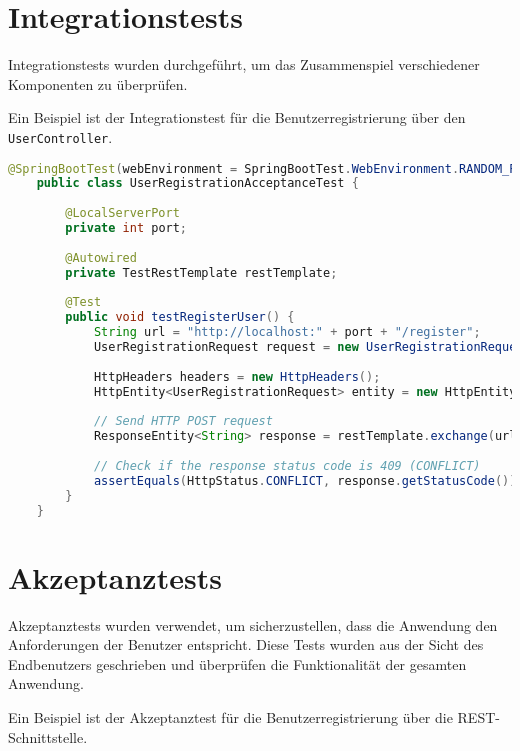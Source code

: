 \section{Integrationstests}

Integrationstests wurden durchgeführt, um das Zusammenspiel verschiedener Komponenten zu überprüfen. 

Ein Beispiel ist der Integrationstest für die Benutzerregistrierung über den \texttt{UserController}.

\begin{lstlisting}[language=Java]
	@SpringBootTest(webEnvironment = SpringBootTest.WebEnvironment.RANDOM_PORT)
	public class UserRegistrationAcceptanceTest {
		
		@LocalServerPort
		private int port;
		
		@Autowired
		private TestRestTemplate restTemplate;
		
		@Test
		public void testRegisterUser() {
			String url = "http://localhost:" + port + "/register";
			UserRegistrationRequest request = new UserRegistrationRequest("testuser", "password", "password");
			
			HttpHeaders headers = new HttpHeaders();
			HttpEntity<UserRegistrationRequest> entity = new HttpEntity<>(request, headers);
			
			// Send HTTP POST request
			ResponseEntity<String> response = restTemplate.exchange(url, HttpMethod.POST, entity, String.class);
			
			// Check if the response status code is 409 (CONFLICT)
			assertEquals(HttpStatus.CONFLICT, response.getStatusCode());
		}
	}
\end{lstlisting}


\section{Akzeptanztests}

Akzeptanztests wurden verwendet, um sicherzustellen, dass die Anwendung den Anforderungen der Benutzer entspricht. Diese Tests wurden aus der Sicht des Endbenutzers geschrieben und überprüfen die Funktionalität der gesamten Anwendung.

Ein Beispiel ist der Akzeptanztest für die Benutzerregistrierung über die REST-Schnittstelle.


